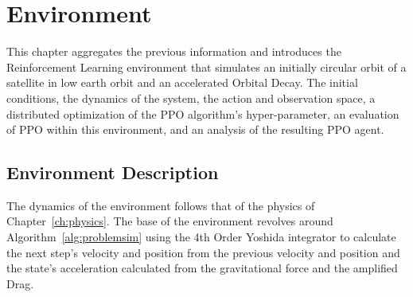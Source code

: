 \chapter{Environment}\label{ch:environment}

This chapter aggregates the previous information and introduces the Reinforcement Learning environment that simulates an initially circular orbit of a satellite in low earth orbit and an accelerated Orbital Decay. The initial conditions, the dynamics of the system, the action and observation space, a distributed optimization of the PPO algorithm's hyper-parameter, an evaluation of PPO within this environment, and an analysis of the resulting PPO agent.

\section{Environment Description}

The dynamics of the environment follows that of the physics of Chapter~\ref{ch:physics}. The base of the environment revolves around Algorithm~\ref{alg:problemsim} using the 4th Order Yoshida integrator to calculate the next step's velocity and position from the previous velocity and position and the state's acceleration calculated from the gravitational force and the amplified Drag. 

